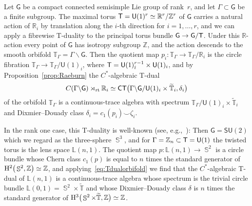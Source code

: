 \documentclass[pdftex]{sigma}
\numberwithin{equation}{section}
\DeclareMathOperator{\Sphere}{\mathbb{S}}
\newcommand{\C}{\complex}
\def\T{{\sf T}}
\def\C{{\sf C}}
\newcommand{\sfG}{\mathsf{G}}
\newcommand{\sfU}{\mathsf{U}}
\newcommand{\sfSU}{\mathsf{SU}}
\newcommand{\rt}{{\rm rt}}
\newcommand{\complex}{{\mathbb C}} %
\newcommand{\zed}{{\mathbb Z}} %
\newcommand{\real}{{\mathbb R}} %
\newcommand{\torus}{{\mathbb T}} %
\begin{document}
Let $\sfG$ be a compact connected semisimple Lie group of rank~$r$,
and let $\Gamma\subset\sfG$ be a finite subgroup. The maximal torus
$\T = \sfU(1)^r \simeq \real^r/\zed^r$ of $\sfG$ carries a natural action of
$\real_i$ by translation along the $i$-th direction for $i=1,\dots,r$,
and we can apply a fibrewise T-duality to
the principal torus bundle $\sfG\to\sfG/\T$. Under this $\real$-action
every point of $\sfG$ has
isotropy subgroup $\zed$, and the action descends to the smooth orbifold
$\torus_\Gamma=\Gamma\backslash\sfG$. Then the quotient map
$p_i\colon \torus_\Gamma\to\torus_\Gamma/\real_i$ is the circle fibration
$\torus_\Gamma\to\torus_\Gamma/\sfU(1)_i$, where
$\T=\sfU(1)^{r-1}_{\hat\imath}\times \sfU(1)_i$, and by
Proposition~\ref{prop:Raeburn} the $C^*$-algebraic T-dual
\begin{gather}\label{eq:Tdualorbifold}
C(\Gamma\backslash\sfG)\rtimes_\rt \real_i \simeq
\C\T\big(\Gamma\backslash\sfG/\sfU(1)_i\times \widetilde\torus_i,\delta_i \big)
\end{gather}
of the orbifold $\torus_\Gamma$ is a continuous-trace algebra with
spectrum $\torus_\Gamma/\sfU(1)_i\times\widetilde\torus_i$ and Dixmier--Douady
class $\delta_i=c_1(p_i)\smile\zeta_i$.

In the rank one case, this T-duality is well-known (see, e.g.,~\cite{Bouwknegt2003}): Then
$\sfG=\sfSU(2)$ which we regard as the three-sphere $\Sphere^3$, and
for $\Gamma=\zed_n\subset\T=\sfU(1)$ the twisted torus is the lens
space $\mathbb{L}(n,1)$. The quotient map $p\colon \mathbb{L}(n,1)\to
\Sphere^2$ is a circle bundle whose Chern class $c_1(p)$ is equal to
$n$ times the standard generator of ${\rm H}^2\big(\Sphere^2,\zed\big)\simeq\zed$, and applying~\eqref{eq:Tdualorbifold} we
find that the
$C^*$-algebraic T-dual of $\mathbb{L}(n,1)$ is a continuous-trace
algebra whose spectrum is the trivial circle bundle
$\mathbb{L}(0,1)=\Sphere^2\times\widetilde\torus$ and whose Dixmier--Douady class $\delta$ is
$n$ times the standard generator of ${\rm
 H}^3\big(\Sphere^2\times\widetilde{\torus},\zed\big)\simeq \zed$.
\end{document}
